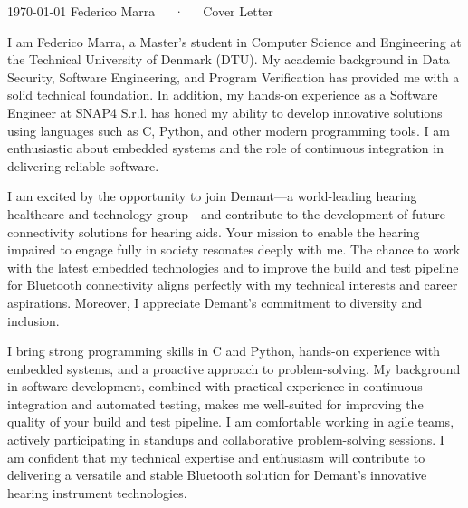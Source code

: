 \documentclass[11pt, a4paper]{awesome-cv}
\begin{document}
\makecvheader[R]

\makecvfooter
  {\today}
  {Federico Marra~~~·~~~Cover Letter}
  {}

\makelettertitle

\begin{cvletter}

I am Federico Marra, a Master’s student in Computer Science and Engineering at the Technical University of Denmark (DTU). My academic background in Data Security, Software Engineering, and Program Verification has provided me with a solid technical foundation. In addition, my hands-on experience as a Software Engineer at SNAP4 S.r.l. has honed my ability to develop innovative solutions using languages such as C, Python, and other modern programming tools. I am enthusiastic about embedded systems and the role of continuous integration in delivering reliable software.

I am excited by the opportunity to join Demant—a world-leading hearing healthcare and technology group—and contribute to the development of future connectivity solutions for hearing aids. Your mission to enable the hearing impaired to engage fully in society resonates deeply with me. The chance to work with the latest embedded technologies and to improve the build and test pipeline for Bluetooth connectivity aligns perfectly with my technical interests and career aspirations. Moreover, I appreciate Demant's commitment to diversity and inclusion.

I bring strong programming skills in C and Python, hands-on experience with embedded systems, and a proactive approach to problem-solving. My background in software development, combined with practical experience in continuous integration and automated testing, makes me well-suited for improving the quality of your build and test pipeline. I am comfortable working in agile teams, actively participating in standups and collaborative problem-solving sessions. I am confident that my technical expertise and enthusiasm will contribute to delivering a versatile and stable Bluetooth solution for Demant's innovative hearing instrument technologies.

\end{cvletter}

\makeletterclosing
\end{document}
